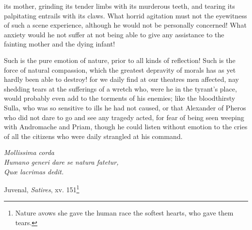 \documentclass[12pt]{report}
\newcommand{\aquote}[2]{\begin{displayquote} #1 \end{displayquote} \hfill #2}
\begin{document}
its mother, grinding its tender limbs with its murderous teeth, and tearing its palpitating entrails with its claws. What horrid agitation must not the eyewitness of such a scene experience, although he would not be personally concerned! What anxiety would he not suffer at not being able to give any assistance to the fainting mother and the dying infant!

Such is the pure emotion of nature, prior to all kinds of reflection! Such is the force of natural compassion, which the greatest depravity of morals has as yet hardly been able to destroy! for we daily find at our theatres men affected, nay shedding tears at the sufferings of a wretch who, were he in the tyrant's place, would probably even add to the torments of his enemies; like the bloodthirsty Sulla, who was so sensitive to ills he had not caused, or that Alexander of Pheros who did not dare to go and see any tragedy acted, for fear of being seen weeping with Andromache and Priam, though he could listen without emotion to the cries of all the citizens who were daily strangled at his command.
\aquote{
\textit{ Mollissima corda \\
Humano generi dare se natura fatetur, \\
Quœ lacrimas dedit.}}
{Juvenal, \textit{Satires}, xv. 151\footnote{Nature avows she gave the human race the softest hearts, who gave them tears.}}
\end{document}
